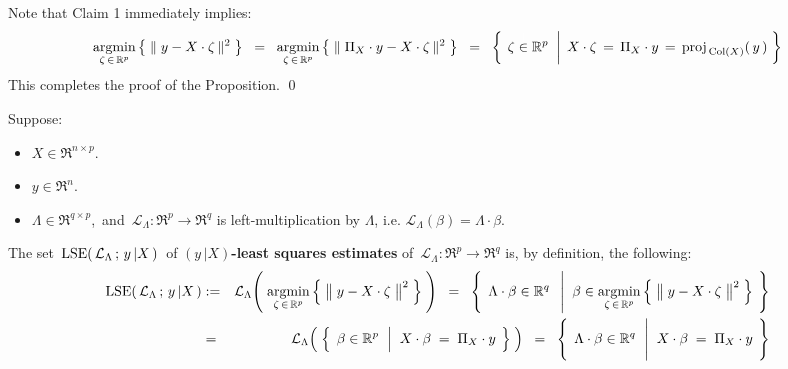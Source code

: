 \vskip 0.5cm
\noindent
Note that Claim 1 immediately implies:
\begin{equation*}
\underset{\zeta\,\in\,\Re^{p}}{\argmin}\left\{\;\Vert\;y - X \cdot \zeta\,\Vert^{2}\;\right\}
\;\; = \;\;
\underset{\zeta\,\in\,\Re^{p}}{\argmin}\left\{\;\Vert\;\Pi_{X} \cdot y - X \cdot \zeta\,\Vert^{2}\;\right\}
\;\; = \;\;
\left\{\;
	\left.
	\zeta \overset{{\color{white}\vert}}{\in} \Re^{p}
	\;\;\right\vert\;
	X \cdot \zeta \,=\, \Pi_{X} \cdot y \,=\, \proj_{\,\Col(X)}(\,y\,)
	\;\right\}
\end{equation*}
This completes the proof of the Proposition.
\qed

\begin{definition}
\mbox{}\vskip 0.1cm\noindent
Suppose:
\begin{itemize}
\item
	$X \in \Re^{n \times p}$.
\item
	$y \in \Re^{n}$.
\item
	$\Lambda \in \Re^{q \times p}$,\,
	and
	\,$\mathcal{L}_{\Lambda} : \Re^{p} \longrightarrow \Re^{q}$ is left-multiplication by $\Lambda$,
	i.e. $\mathcal{L}_{\Lambda}(\beta) = \Lambda \cdot \beta$.
\end{itemize}
The set \,$\textnormal{LSE}\!\left(\,\mathcal{L}_{\Lambda} \,;\, y\,\vert X\,\right)$\,
of \textbf{$(y\,\vert X)$-least squares estimates} of
\,$\mathcal{L}_{\Lambda} : \Re^{p} \longrightarrow \Re^{q}$
is, by definition, the following:
\begin{eqnarray*}
\lse\!\left(\,\mathcal{L}_{\Lambda} \,;\, y\,\vert X\,\right)
&:=&
	\mathcal{L}_{\Lambda}\!\left(\;
		\underset{\zeta\,\in\,\Re^{p}}{\argmin}
		\left\{\;\left\Vert\;\overset{{\color{white}.}}{y} - X\cdot\zeta\;\right\Vert^{2}\;\right\}
		\;\right)
\;\; = \;\;
	\left\{\;\,
		\Lambda\cdot\beta \overset{{\color{white}.}}{\in} \Re^{q}
		\;\;\left\vert\;\;
		\beta \in \underset{\zeta\,\in\,\Re^{p}}{\argmin}
			\left\{\;\left\Vert\;\overset{{\color{white}.}}{y} - X\cdot\zeta\;\right\Vert^{2}\;\right\}
		\right.
		\;\right\}
\\
&=&
	\mathcal{L}_{\Lambda}\!\left(\;
		\left\{\;\,
			\beta \overset{{\color{white}.}}{\in} \Re^{p}
			\;\,\left\vert\;\;
			\overset{{\color{white}.}}{X} \cdot \beta \;=\; \Pi_{X} \cdot y
			\right.
			\;\right\}
		\;\right)
\;\; = \;\;
	\left\{\;\,
		\Lambda\cdot\beta \overset{{\color{white}.}}{\in} \Re^{q}
		\;\,\left\vert\;\;
		\overset{{\color{white}\vert}}{X} \cdot \beta \;=\; \Pi_{X} \cdot y
		\right.
		\;\right\}
\end{eqnarray*}
\end{definition}

